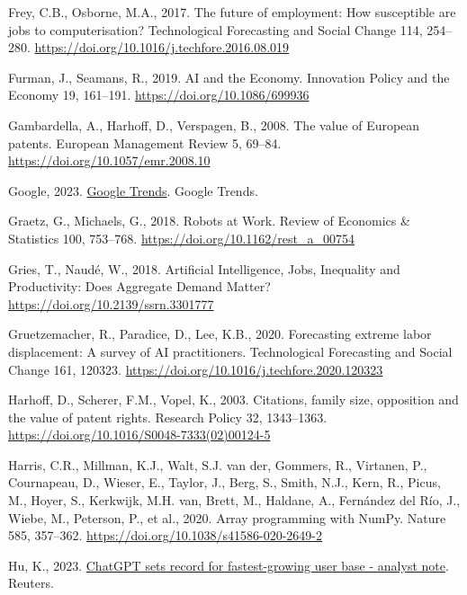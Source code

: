 \documentclass[
  12pt,
  a4paperpaper,
]{article}
\newlength{\cslhangindent}
\newenvironment{CSLReferences}[2] %
 {\begin{list}{}{%
  \setlength{\itemindent}{0pt}
  \setlength{\leftmargin}{0pt}
  \setlength{\parsep}{0pt}
  \ifodd #1
   \setlength{\leftmargin}{\cslhangindent}
   \setlength{\itemindent}{-1\cslhangindent}
  \fi
  \setlength{\itemsep}{#2\baselineskip}}}
 {\end{list}}
\begin{document}
\begin{CSLReferences}{1}{0}
Frey, C.B., Osborne, M.A., 2017. The future of employment: {How}
susceptible are jobs to computerisation? Technological Forecasting and
Social Change 114, 254--280.
\url{https://doi.org/10.1016/j.techfore.2016.08.019}

Furman, J., Seamans, R., 2019. {AI} and the {Economy}. Innovation Policy
and the Economy 19, 161--191. \url{https://doi.org/10.1086/699936}

Gambardella, A., Harhoff, D., Verspagen, B., 2008. The value of
{European} patents. European Management Review 5, 69--84.
\url{https://doi.org/10.1057/emr.2008.10}

Google, 2023.
\href{https://trends.google.com/trends/explore?date=all&q=AI&hl=en}{Google
{Trends}}. Google Trends.

Graetz, G., Michaels, G., 2018. Robots at {Work}. Review of Economics \&
Statistics 100, 753--768. \url{https://doi.org/10.1162/rest_a_00754}

Gries, T., Naudé, W., 2018. Artificial {Intelligence}, {Jobs},
{Inequality} and {Productivity}: {Does} {Aggregate} {Demand} {Matter}?
\url{https://doi.org/10.2139/ssrn.3301777}

Gruetzemacher, R., Paradice, D., Lee, K.B., 2020. Forecasting extreme
labor displacement: {A} survey of {AI} practitioners. Technological
Forecasting and Social Change 161, 120323.
\url{https://doi.org/10.1016/j.techfore.2020.120323}

Harhoff, D., Scherer, F.M., Vopel, K., 2003. Citations, family size,
opposition and the value of patent rights. Research Policy 32,
1343--1363. \url{https://doi.org/10.1016/S0048-7333(02)00124-5}

Harris, C.R., Millman, K.J., Walt, S.J. van der, Gommers, R., Virtanen,
P., Cournapeau, D., Wieser, E., Taylor, J., Berg, S., Smith, N.J., Kern,
R., Picus, M., Hoyer, S., Kerkwijk, M.H. van, Brett, M., Haldane, A.,
Fernández del Río, J., Wiebe, M., Peterson, P., et al., 2020. Array
programming with {NumPy}. Nature 585, 357--362.
\url{https://doi.org/10.1038/s41586-020-2649-2}

Hu, K., 2023.
\href{https://www.reuters.com/technology/chatgpt-sets-record-fastest-growing-user-base-analyst-note-2023-02-01/}{{ChatGPT}
sets record for fastest-growing user base - analyst note}. Reuters.


\end{CSLReferences}
\end{document}
